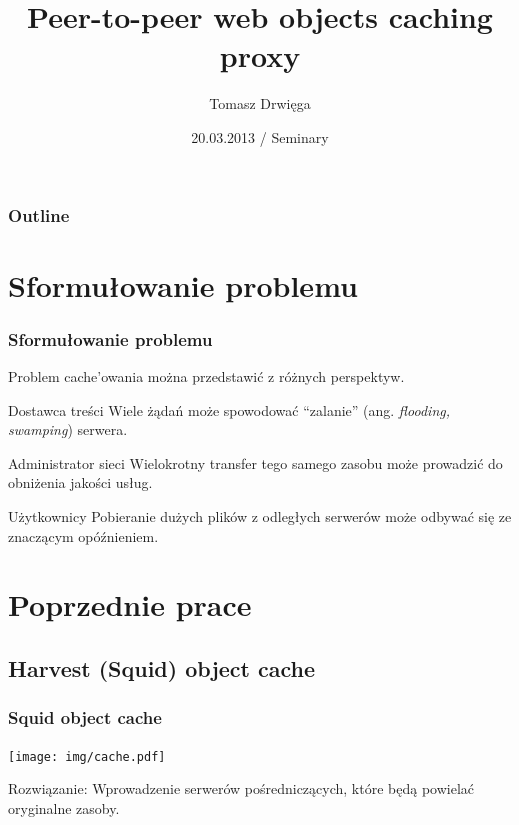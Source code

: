 \documentclass{beamer}
\title{Peer-to-peer web objects caching proxy}
\author{Tomasz Drwięga}
\date{20.03.2013 / Seminary}
\begin{document}
\begin{frame}
\titlepage
\end{frame}

\begin{frame}
\frametitle{Outline}
\tableofcontents
\end{frame}


\section{Sformułowanie problemu}

\begin{frame}
\frametitle{Sformułowanie problemu}
Problem cache'owania można przedstawić z różnych perspektyw.

\begin{block}{Dostawca treści}
Wiele żądań może spowodować ``zalanie'' (ang. \textit{flooding, swamping}) serwera.
\end{block}
\begin{block}{Administrator sieci}
Wielokrotny transfer tego samego zasobu może prowadzić do obniżenia jakości usług.
\end{block}
\begin{block}{Użytkownicy}
Pobieranie dużych plików z odległych serwerów może odbywać się ze znaczącym opóźnieniem.
\end{block}
\end{frame}


\section{Poprzednie prace}
\subsection{Harvest (Squid) object cache}

\begin{frame}
\frametitle{Squid object cache}
\centering
\texttt{[image: img/cache.pdf]}

\begin{block}{}
Rozwiązanie: Wprowadzenie serwerów pośredniczących, które będą powielać oryginalne zasoby.
\end{block}

\end{frame}
\end{document}
